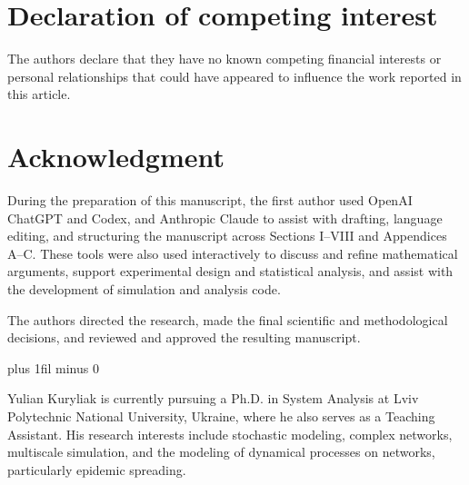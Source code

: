 \documentclass{ieeeaccess}
\begin{document}
\section*{Declaration of competing interest}
The authors declare that they have no known competing financial interests or
personal relationships that could have appeared to influence the work reported
in this article.

\section*{Acknowledgment}
During the preparation of this manuscript, the first author used OpenAI ChatGPT and Codex, and Anthropic Claude to assist with drafting, language editing, and structuring the manuscript across Sections I–VIII and Appendices A–C. These tools were also used interactively to discuss and refine mathematical arguments, support experimental design and statistical analysis, and assist with the development of simulation and analysis code.

The authors directed the research, made the final scientific and methodological decisions, and reviewed and approved the resulting manuscript.



\patchcmd{\IEEEbiographynophoto}
  {\baselineskip plus 1fil minus 0\baselineskip}
  {\baselineskip}
  {}{\PackageError{manuscript}{Biography spacing patch failed}{Check the IEEE Access class.}}
\raggedbottom
\begin{IEEEbiographynophoto}{Yulian Kuryliak}
is currently pursuing a Ph.D. in System Analysis at Lviv Polytechnic National University, Ukraine, where he also serves as a Teaching Assistant.
His research interests include stochastic modeling, complex networks, multiscale simulation, and the modeling of dynamical processes on networks, particularly epidemic spreading.
\end{IEEEbiographynophoto}
\end{document}
